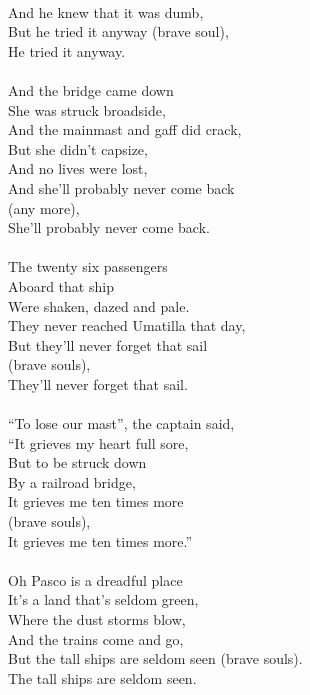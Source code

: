 \documentclass[letterpaper,14pt]{extarticle}
\begin{document}
\\And he knew that it was dumb,
\\But he tried it anyway (brave soul),
\\He tried it anyway.
\\
\\And the bridge came down
\\She was struck broadside,
\\And the mainmast and gaff did crack,
\\But she didn't capsize,
\\And no lives were lost,
\\And she'll probably never come back
\\(any more),
\\She'll probably never come back.
\\
\\The twenty six passengers
\\Aboard that ship
\\Were shaken, dazed and pale.
\\They never reached Umatilla that day,
\\But they'll never forget that sail
\\(brave souls),
\\They'll never forget that sail.
\\
\\“To lose our mast”, the captain said,
\\“It grieves my heart full sore,
\\But to be struck down
\\By a railroad bridge,
\\It grieves me ten times more
\\(brave souls),
\\It grieves me ten times more.”
\\
\\Oh Pasco is a dreadful place
\\It's a land that's seldom green,
\\Where the dust storms blow,
\\And the trains come and go,
\\But the tall ships are seldom seen (brave souls).
\\The tall ships are seldom seen.
\end{document}
